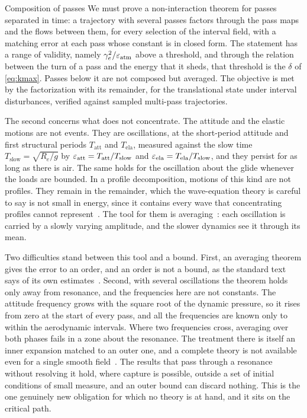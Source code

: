 \documentclass[english,11pt]{extarticle}
\begin{document}
\begin{openitem}{Composition of passes}
\label{obj:composition}
We must prove a non-interaction theorem for passes separated in time: a
trajectory with several passes factors through the pass maps and the flows
between them, for every selection of the interval field, with a matching
error at each pass whose constant is in closed form. The statement has a
range of validity, namely $\gamma_e^2/\varepsilon_{\mathrm{atm}}$ above a
threshold, and through the relation between the turn of a pass and the
energy that it sheds, that threshold is the $\delta$ of \cref{eq:kmax}.
Passes below it are not composed but averaged. The objective is met by the
factorization with its remainder, for the translational state under interval
disturbances, verified against sampled multi-pass trajectories.
\end{openitem}

The second concerns what does not concentrate. The attitude and the elastic
motions are not events. They are oscillations, at the short-period attitude
and first structural periods $T_{\mathrm{att}}$ and $T_{\mathrm{ela}}$,
measured against the slow time $T_{\mathrm{slow}} = \sqrt{R_e/g}$ by
$\varepsilon_{\mathrm{att}} = T_{\mathrm{att}}/T_{\mathrm{slow}}$ and
$\varepsilon_{\mathrm{ela}} = T_{\mathrm{ela}}/T_{\mathrm{slow}}$, and they persist
for as long as there is air. The same holds for the oscillation about the
glide whenever the loads are bounded. In a profile decomposition, motions of
this kind are not profiles. They remain in the remainder, which the
wave-equation theory is careful to say is not small in energy, since it
contains every wave that concentrating profiles cannot
represent~\cite[p.~136]{bahouri1999high}. The tool for them is
averaging~\cite{khalil2002nonlinear,sanders2007averaging}: each oscillation
is carried by a slowly varying amplitude, and the slower dynamics see it
through its mean.

Two difficulties stand between this tool and a bound. First, an averaging
theorem gives the error to an order, and an order is not a bound, as the
standard text says of its own
estimates~\cite[Sec.~10.1]{khalil2002nonlinear}. Second, with several
oscillations the theorem holds only away from resonance, and the frequencies
here are not constants. The attitude frequency grows with the square root of
the dynamic pressure, so it rises from zero at the start of every pass, and
all the frequencies are known only to within the aerodynamic intervals.
Where two frequencies cross, averaging over both phases fails in a zone
about the resonance. The treatment there is itself an inner expansion
matched to an outer one, and a complete theory is not available even for a
single smooth field~\cite[Chs.~7--8]{sanders2007averaging}. The results that
pass through a resonance without resolving it hold, where capture is
possible, outside a set of initial conditions of small measure, and an outer
bound can discard nothing. This is the one genuinely new obligation for
which no theory is at hand, and it sits on the critical path.
\end{document}
